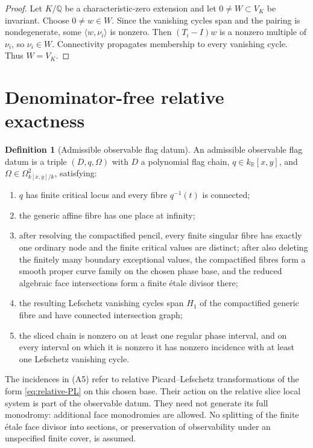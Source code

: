 \documentclass[11pt]{article}
\numberwithin{equation}{section}
\theoremstyle{definition}
\newtheorem{definition}[definition]{Definition}
\theoremstyle{remark}
\newcommand{\Q}{\mathbb Q}
\newcommand{\R}{\mathbb R}
\begin{document}
\begin{proof}
Let $K/\Q$ be a characteristic-zero extension and let
$0\ne W\subset V_K$ be invariant.  Choose $0\ne w\in W$.  Since the
vanishing cycles span and the pairing is nondegenerate, some
$\langle w,\nu_i\rangle$ is nonzero.  Then
$(T_i-I)w$ is a nonzero multiple of $\nu_i$, so $\nu_i\in W$.
Connectivity propagates membership to every vanishing cycle.  Thus
$W=V_K$.
\end{proof}

\section{Denominator-free relative exactness}\label{sec:relative-exactness}

\begin{definition}[Admissible observable flag datum]\label{def:admissible}
An admissible observable flag datum is a triple $(D,q,\Omega)$ with $D$ a
polynomial flag chain, $q\in k_{\R}[x,y]$, and
$\Omega\in\Omega^2_{k[x,y]/k}$, satisfying:
\begin{enumerate}[label=\textup{(A\arabic*)},leftmargin=3.2em]
\item $q$ has finite critical locus and every fibre $q^{-1}(t)$ is connected;
\item the generic affine fibre has one place at infinity;
\item after resolving the compactified pencil, every finite singular fibre
      has exactly one ordinary node and the finite critical values are
      distinct; after also deleting the finitely many boundary exceptional
      values, the compactified fibres form a smooth proper curve family
      on the chosen phase base, and the reduced algebraic face intersections
      form a finite \'etale divisor there;
\item the resulting Lefschetz vanishing cycles span $H_1$ of the compactified
      generic fibre and have connected intersection graph;
\item the sliced chain is nonzero on at least one regular phase interval,
      and on every interval on which it is nonzero it has nonzero incidence
      with at least one Lefschetz vanishing cycle.
\end{enumerate}
\end{definition}

The incidences in \textup{(A5)} refer to relative Picard--Lefschetz
transformations of the form \eqref{eq:relative-PL} on this chosen base.
Their action on the relative slice local system is part of the observable
datum. They need not generate its full monodromy: additional face
monodromies are allowed. No splitting of the finite \'etale face divisor
into sections, or preservation of observability under an unspecified
finite cover, is assumed.
\end{document}
